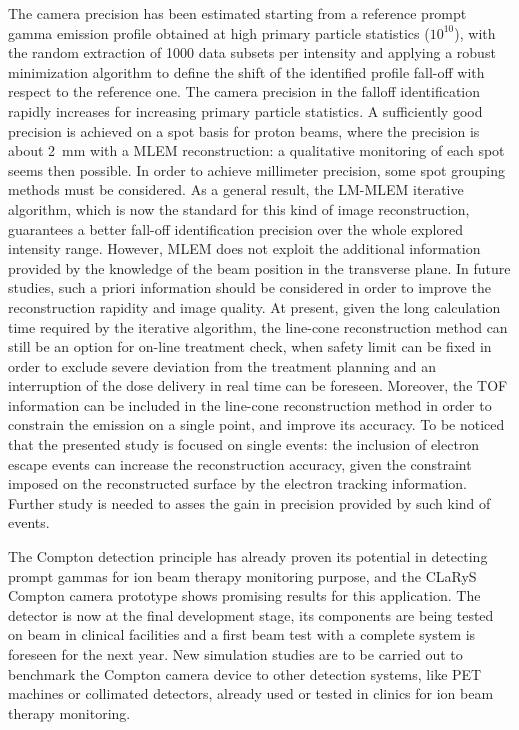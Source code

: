 The camera precision has been estimated starting from a reference prompt gamma emission profile obtained at high primary particle statistics ($10^{10}$), with the random extraction of 1000 data subsets per intensity and applying a robust minimization algorithm to define the shift of the identified profile fall-off with respect to the reference one.
The camera precision in the falloff identification rapidly increases for increasing primary particle statistics. A sufficiently good precision is achieved on a spot basis for proton beams, where the precision is about 2~mm with a MLEM reconstruction: a qualitative monitoring of each spot seems then possible. In order to achieve millimeter precision, some spot grouping methods must be considered. As a general result, the LM-MLEM iterative algorithm, which is now the standard for this kind of image reconstruction,  guarantees a better fall-off identification precision over the whole explored intensity range. However, MLEM does not exploit the additional information provided by the knowledge of the beam position in the transverse plane. In future studies, such a priori information should be considered in order to improve the reconstruction rapidity and image quality. At present, given the long calculation time required by the iterative algorithm, the line-cone reconstruction method can still be an option for on-line treatment check, when safety limit can be fixed in order to exclude severe deviation from the treatment planning and an interruption of the dose delivery in real time can be foreseen. Moreover, the TOF information can be included in the line-cone reconstruction method in order to constrain the emission on a single point, and improve its accuracy.
To be noticed that the presented study is focused on single events: the inclusion of electron escape events can increase the reconstruction accuracy, given the constraint imposed on the reconstructed surface by the electron tracking information. Further study is needed to asses the gain in precision provided by such kind of events. 

The Compton detection principle has already proven its potential in detecting prompt gammas for ion beam therapy monitoring purpose, and the CLaRyS Compton camera prototype shows promising results for this application. The detector is now at the final development stage, its components are being tested on beam in clinical facilities and a first beam test with a complete system is foreseen for the next year. New simulation studies are to be carried out to benchmark the Compton camera device to other detection systems, like PET machines or collimated detectors, already used or tested in clinics for ion beam therapy monitoring.            


